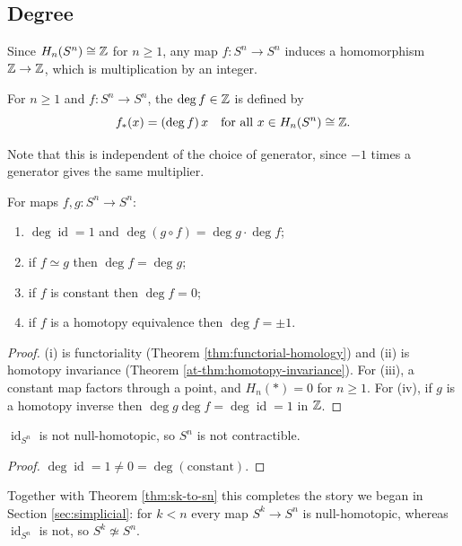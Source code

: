 \documentclass[a4paper]{scrartcl}
\newcommand{\id}{\operatorname{id}}
\begin{document}
\subsection{Degree}

Since $H_n(S^n)\cong\mathbb{Z}$ for $n \geq 1$, any map $f: S^n \to S^n$ induces a homomorphism
$\mathbb{Z}\to\mathbb{Z}$, which is multiplication by an integer.

\begin{definition}[Degree]
	For $n \geq 1$ and $f: S^n \to S^n$, the  $\deg f \in \mathbb{Z}$ is defined by
	$$
	f_*(x) = (\deg f)\, x \quad \text{for all } x \in H_n(S^n)\cong\mathbb{Z}.
	$$
\end{definition}

Note that this is independent of the choice of generator, since $-1$ times a generator
gives the same multiplier.

\begin{proposition} \label{prop:degree-props}
	For maps $f, g: S^n \to S^n$:
	\begin{enumerate}
		\item $\deg\id = 1$ and $\deg(g\circ f) = \deg g \cdot \deg f$;
		\item if $f \simeq g$ then $\deg f = \deg g$;
		\item if $f$ is constant then $\deg f = 0$;
		\item if $f$ is a homotopy equivalence then $\deg f = \pm 1$.
	\end{enumerate}
\end{proposition}
\begin{proof}
	(i) is functoriality (Theorem \ref{thm:functorial-homology}) and (ii) is homotopy invariance (Theorem \ref{at-thm:homotopy-invariance}). For (iii), a constant map factors through a point, and $H_n(*) = 0$ for $n \geq 1$. For (iv), if $g$ is a homotopy inverse then $\deg g \deg f = \deg\id = 1$ in $\mathbb{Z}$.
\end{proof}

\begin{corollary}
	$\id_{S^n}$ is not null-homotopic, so $S^n$ is not contractible.
\end{corollary}
\begin{proof}
	$\deg \id = 1 \neq 0 = \deg(\text{constant})$.
\end{proof}

Together with Theorem \ref{thm:sk-to-sn} this completes the story we began in Section
\ref{sec:simplicial}: for $k < n$ every map $S^k \to S^n$ is null-homotopic, whereas
$\id_{S^n}$ is not, so $S^k \not\simeq S^n$.
\end{document}
